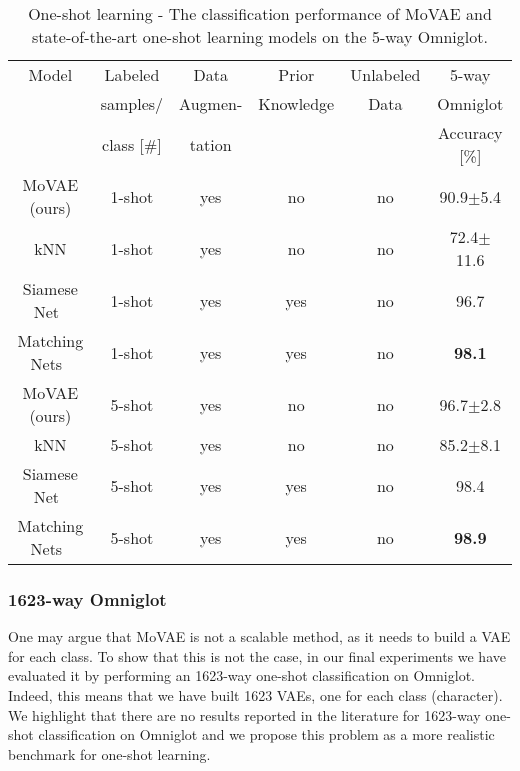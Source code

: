 \documentclass[sigconf,authorversion=true]{aamas}  %
\begin{document}
\begin{table}[t!]
\caption{One-shot learning - The classification performance of MoVAE and state-of-the-art one-shot learning models on the 5-way Omniglot.}
\footnotesize
\tabcolsep=0.06cm
\begin{tabular}{|c|c|c|c|c|c|}
\hline
Model&Labeled&Data&Prior&Unlabeled&5-way\\
&samples/&Augmen-&Knowledge&Data&Omniglot\\
&class [\#]&tation&&&Accuracy [\%]\\
\hline
\hline
MoVAE (ours)&1-shot&yes&no&no&90.9$\pm$5.4\\
kNN&1-shot&yes&no&no&72.4$\pm$11.6\\
Siamese Net~\cite{Koch2015SiameseNN}&1-shot&yes&yes&no&96.7\\
Matching Nets~\cite{VinyalsBLKW16}&1-shot&yes&yes&no&\textbf{98.1}\\
\hline
MoVAE (ours)&5-shot&yes&no&no&96.7$\pm$2.8\\
kNN&5-shot&yes&no&no&85.2$\pm$8.1\\
Siamese Net~\cite{Koch2015SiameseNN}&5-shot&yes&yes&no&98.4\\
Matching Nets~\cite{VinyalsBLKW16}&5-shot&yes&yes&no&\textbf{98.9}\\
\hline
\end{tabular}
\label{tab:oneshotomniglot}
\vspace*{-1em}
\end{table}\subsubsection{1623-way Omniglot}

One may argue that MoVAE is not a scalable method, as it needs to build a VAE for each class. To show that this is not the case, in our final experiments we have evaluated it by performing an 1623-way one-shot classification on Omniglot. Indeed, this means that we have built 1623 VAEs, one for each class (character). We highlight that there are no results reported in the literature for 1623-way one-shot classification on Omniglot and we propose this problem as a more realistic benchmark for one-shot learning.
\end{document}
